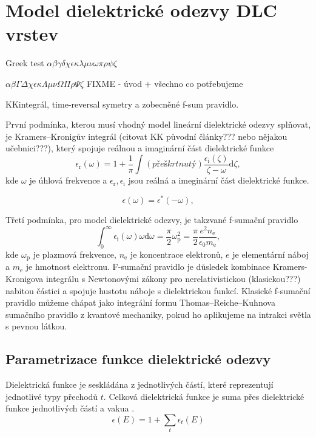 \chapter{Model dielektrické odezvy DLC vrstev}
Greek test
$\alpha \beta \gamma \delta \chi \epsilon \kappa \lambda \mu \nu \omega \pi \rho \psi \zeta$

$\alpha \beta \Gamma \Delta \chi \epsilon \kappa \Lambda \mu \nu \Omega \Pi \rho \Psi \zeta$
FIXME - úvod + všechno co potřebujeme 

KKintegrál, time-reversal symetry a zobecněné f-sum pravidlo.

První podmínka, kterou musí vhodný model lineární dielektrické odezvy splňovat, je Kramers--Kronigův integrál (citovat KK původní články??? nebo nějakou učebnici???), který spojuje reálnou a imaginární část dielektrické funkce  
\begin{equation}
\epsilon_\mathrm{r}(\omega) = 1 + \frac{1}{\pi} \int (přeškrtnutý) \frac{\epsilon_\mathrm{i}(\zeta)}{\zeta - \omega} \mathrm{d}\zeta \mathrm{,}
\label{KKint}
\end{equation}
kde $\omega$ je úhlová frekvence a $\epsilon_\mathrm{r}, \epsilon_\mathrm{i}$ jsou reálná a imeginární část dielektrické funkce.  

\begin{equation}
\epsilon(\omega) =\epsilon^* (-\omega) \mathrm{,}
\label{casovasymetrie}
\end{equation}

Třetí podmínka, pro model dielektrické odezvy, je takzvané f-sumační pravidlo
\begin{equation}
\int_0^\infty \epsilon_\mathrm{i} (\omega) \omega \mathrm{d} \omega = \frac{\pi}{2} \omega_\mathrm{p}^2 = \frac{\pi}{2} \frac{e^2 n_\mathrm{e}}{ \epsilon_0 m_\mathrm{e}} \mathrm{,}
\end{equation}
kde $\omega_\mathrm{p}$ je plazmová frekvence, $n_\mathrm{e}$ je koncentrace elektronů, $e$ je elementární náboj a $m_\mathrm{e}$ je hmotnost elektronu. F-sumační pravidlo je důsledek kombinace Kramers-Kronigova integrálu s Newtonovými zákony pro nerelativistickou (klasickou???) nabitou částici a spojuje hustotu náboje s dielektrickou funkcí. Klasické f-sumační pravidlo můžeme chápat jako integrální formu Thomas--Reiche--Kuhnova sumačního pravidlo z kvantové mechaniky, pokud ho aplikujeme na intrakci světla s pevnou látkou.  
 

\section{ Parametrizace funkce dielektrické  odezvy}
Dielektrická funkce je seskládána z jednotlivých částí, které reprezentují jednotlivé typy přechodů $t$. Celková dielektrická funkce je suma přes dielektrické funkce jednotlivých částí a vakua \cite{sumrule1}. 
\begin{equation}
\epsilon(E) = 1 + \sum_t \epsilon_t(E)
\label{suma1}
\end{equation}

